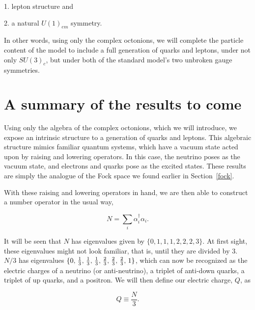 \documentclass[letterpaper,12pt,titlepage,oneside,final]{book}
\begin{document}
1.  lepton structure and 

2.  a natural $U(1)_{em}$ symmetry.  

\noindent In other words, using only the complex octonions, we will complete the particle content of the model to include a full generation of quarks and leptons, under not only $SU(3)_c$, but under both of the standard model's two unbroken gauge symmetries.


\section{A summary of the results to come  }




Using only the algebra of the complex octonions, which we will introduce, we expose an intrinsic structure to a generation of quarks and leptons.  This algebraic structure mimics familiar quantum systems, which have a vacuum state acted upon by raising and lowering operators.     In this case, the neutrino poses as the vacuum state, and electrons and quarks pose as the excited states.  These results are simply the analogue of the Fock space we found earlier in Section~\ref{fock}.

With these raising and lowering operators in hand, we are then able to construct a number operator in the usual way,

\begin{equation}N= \sum_i \alpha_i^{\dagger}\alpha_i.
\end{equation}

\noindent It will be seen that $N$ has eigenvalues given by $\{0,1,1,1,2,2,2,3\}$.  At first sight, these eigenvalues might not look familiar, that is, until they are divided by 3.  $N/3$ has eigenvalues $\{0,\hspace{.5mm}\frac{1}{3},\hspace{.5mm}\frac{1}{3},\hspace{.5mm}\frac{1}{3}, \hspace{.5mm}\frac{2}{3},\hspace{.5mm}\frac{2}{3},\hspace{.5mm}\frac{2}{3},\hspace{.5mm}1\}$, which can now be recognized as the electric charges of a neutrino (or anti-neutrino), a triplet of anti-down quarks, a triplet of up quarks, and a positron.   We will then define our electric charge, $Q$, as

\begin{equation}\label{Q}
Q\equiv\frac{N}{3}.
\end{equation}
\end{document}
